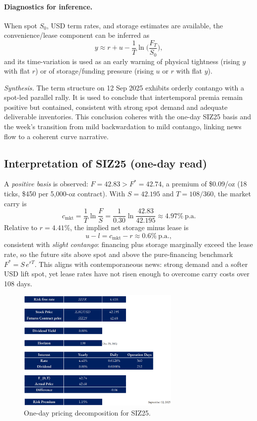 \documentclass[10pt,a4paper]{article} %
\begin{document}
\paragraph{Diagnostics for inference.}
When spot \(S_0\), USD term rates, and storage estimates are available, the convenience/lease component can be inferred as
\[
y \approx r + u - \frac{1}{T} \ln\!\Big(\frac{F_T}{S_0}\Big),
\]
and its time-variation is used as an early warning of physical tightness (rising \(y\) with flat \(r\)) or of storage/funding pressure (rising \(u\) or \(r\) with flat \(y\)).

\medskip
\noindent\emph{Synthesis.} The term structure on 12 Sep 2025 exhibits orderly contango with a spot-led parallel rally. It is used to conclude that intertemporal premia remain positive but contained, consistent with strong spot demand and adequate deliverable inventories. This conclusion coheres with the one-day SIZ25 basis and the week’s transition from mild backwardation to mild contango, linking news flow to a coherent curve narrative.


\subsection{Interpretation of \texorpdfstring{SIZ25}{SIZ25} (one-day read)}
A \emph{positive basis} is observed: \(F=42.83>F^{*}=42.74\), a premium of \$0.09/oz (18 ticks, \$450 per 5{,}000-oz contract). With \(S=42.195\) and \(T=108/360\), the market carry is
\[
c_{\mathrm{mkt}}=\frac{1}{T}\ln\!\frac{F}{S}
=\frac{1}{0.30}\ln\!\frac{42.83}{42.195}\approx 4.97\%\ \text{p.a.}
\]
Relative to \(r=4.41\%\), the implied net storage minus lease is
\[
u-l=c_{\mathrm{mkt}}-r\approx 0.6\%\ \text{p.a.},
\]
consistent with \emph{slight contango}: financing plus storage marginally exceed the lease rate, so the future sits above spot and above the pure-financing benchmark \(F^{*}=S\,e^{rT}\). This aligns with contemporaneous news: strong demand and a softer USD lift spot, yet lease rates have not risen enough to overcome carry costs over 108 days.

\begin{figure}[h]
\centering
\includegraphics[width=0.7\textwidth]{figures/silver_pricing_one_day.png}
\caption{One-day pricing decomposition for SIZ25.}
\label{fig:silver_one_day}
\end{figure}
\end{document}
